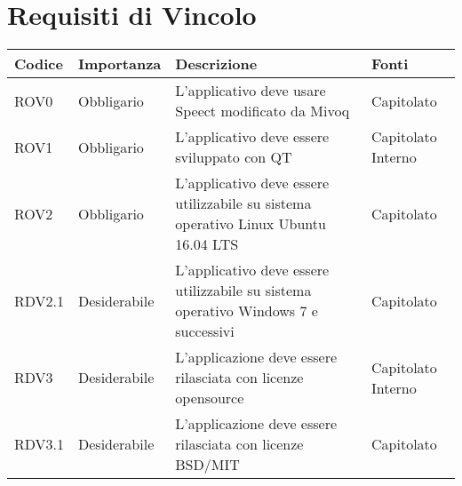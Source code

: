 \documentclass[../AnalisideiRequisiti.tex]{subfiles}
\begin{document}
	\section{Requisiti di Vincolo}
			\begin{longtable}{| p{2cm} | p{2.5cm} |p{5cm} | p{2.5cm} |}
			\hline
			\textbf{Codice} & \textbf{Importanza} & \textbf{Descrizione} & \textbf{Fonti}\\
			\hline
			\endhead
				\newline ROV0&\newline Obbligario&
			\newline 
			L'applicativo deve usare Speect modificato da Mivoq &
			\newline Capitolato
			\\[1em]
			\hline	
			\newline 
			ROV1&\newline Obbligario&
			\newline 
			L'applicativo deve essere sviluppato con QT &
			\newline Capitolato
			\newline Interno
			\\[1em]
			\hline
			\newline 
			ROV2&\newline Obbligario&
			\newline 
			L'applicativo deve essere utilizzabile su sistema operativo Linux Ubuntu 16.04 LTS&
			\newline Capitolato
			\\[1em]
			\hline
			\newline
			RDV2.1&\newline Desiderabile&
			\newline 
			L'applicativo deve essere utilizzabile su sistema operativo Windows 7 e successivi&
			\newline Capitolato
			\\[1em]
			\hline
			\newline
			RDV3&\newline Desiderabile&
			\newline 
			L'applicazione deve essere rilasciata con licenze opensource&
			\newline Capitolato \newline Interno
			\\[1em]
			\hline	
			\newline
			RDV3.1&\newline Desiderabile&
			\newline 
			L'applicazione deve essere rilasciata con licenze BSD/MIT &
			\newline Capitolato
			\\[1em]
			\hline
	\end{longtable}
\newpage
\end{document}

